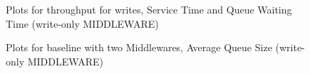 \documentclass[11pt,a4paper]{article}
\begin{document}
\begin{figure}[!h]
  \centering
  \caption{Plots for throughput for writes, Service Time and Queue Waiting Time (write-only MIDDLEWARE)}
  \label{fig:throughput_for_writes_mw_c_wo}
\end{figure}

\begin{figure}[!h]
  \centering
    \caption{Plots for baseline with two Middlewares, Average Queue Size (write-only MIDDLEWARE)}
    \label{fig:throughput_for_writes_mw_qs_wo}
\end{figure}
\end{document}
